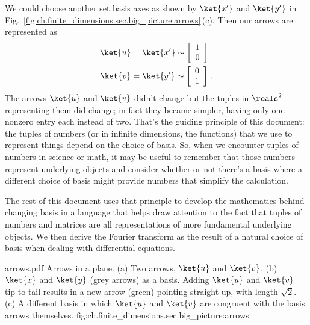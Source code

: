 We could choose another set basis axes as shown by $\ket{x'}$ and $\ket{y'}$ in Fig.~\ref{fig:ch.finite_dimensions.sec.big_picture:arrows}\,(c).
Then our arrows are represented as
\begin{align}
  \ket{u}
    &= \ket{x'} \sim \left[\begin{array}{c} 1 \\ 0 \end{array} \right] \\
  \ket{v}
    &= \ket{y'} \sim \left[\begin{array}{c} 0 \\ 1 \end{array} \right]
  \, .
\end{align}
The arrows $\ket{u}$ and $\ket{v}$ didn't change but the tuples in $\reals^2$ representing them did change; in fact they became simpler, having only one nonzero entry each instead of two.
That's the guiding principle of this document: the tuples of numbers (or in infinite dimensions, the functions) that we use to represent things depend on the choice of basis.
So, when we encounter tuples of numbers in science or math, it may be useful to remember that those numbers represent underlying objects and consider whether or not there's a basis where a different choice of basis might provide numbers that simplify the calculation.

The rest of this document uses that principle to develop the mathematics behind changing basis in a language that helps draw attention to the fact that tuples of numbers and matrices are all representations of more fundamental underlying objects.
We then derive the Fourier transform as the result of a natural choice of basis when dealing with differential equations.

\quickfig{\columnwidth}
{arrows.pdf}
{Arrows in a plane. (a) Two arrows, $\ket{u}$ and $\ket{v}$. (b) $\ket{x}$ and $\ket{y}$ (grey arrows) as a basis. Adding $\ket{u}$ and $\ket{v}$ tip-to-tail results in a new arrow (green) pointing straight up, with length $\sqrt{2}$. (c) A different basis in which $\ket{u}$ and $\ket{v}$ are congruent with the basis arrows themselves.}
{fig:ch.finite_dimensions.sec.big_picture:arrows}
